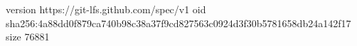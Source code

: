 version https://git-lfs.github.com/spec/v1
oid sha256:4a88dd0f879ca740b98c38a37f9cd827563c0924d3f30b5781658db24a142f17
size 76881
